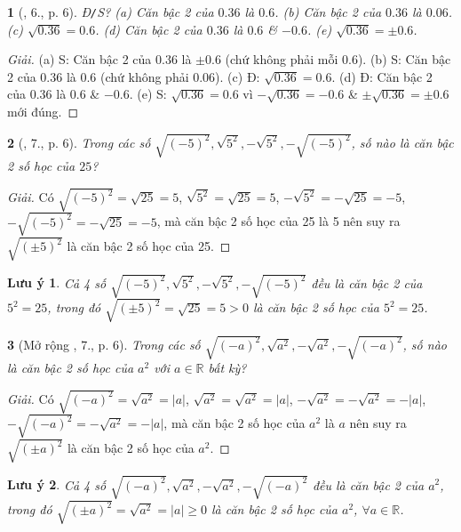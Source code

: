 \documentclass{article}
\newtheorem{baitoan}{}%
\newtheorem{luuy}{Lưu ý}
\begin{document}
\begin{baitoan}[\cite{SBT_Toan_9_tap_1}, 6., p. 6]
	\emph{Đ\texttt{/}S?} (a) Căn bậc 2 của $0.36$ là $0.6$. (b) Căn bậc 2 của $0.36$ là $0.06$. (c) $\sqrt{0.36} = 0.6$. (d) Căn bậc 2 của $0.36$ là $0.6$ \& $-0.6$. (e) $\sqrt{0.36} = \pm0.6$.
\end{baitoan}

\begin{proof}[Giải]
	(a) S: Căn bậc 2 của 0.36 là $\pm0.6$ (chứ không phải mỗi 0.6). (b) S: Căn bậc 2 của 0.36 là 0.6 (chứ không phải 0.06). (c) Đ: $\sqrt{0.36} = 0.6$. (d) Đ: Căn bậc 2 của $0.36$ là $0.6$ \& $-0.6$. (e) S: $\sqrt{0.36} = 0.6$ vì $-\sqrt{0.36} = -0.6$ \& $\pm\sqrt{0.36} = \pm0.6$ mới đúng.
\end{proof}

\begin{baitoan}[\cite{SBT_Toan_9_tap_1}, 7., p. 6]
	Trong các số $\sqrt{(-5)^2},\sqrt{5^2},-\sqrt{5^2},-\sqrt{(-5)^2}$, số nào là căn bậc 2 số học của $25$?
\end{baitoan}

\begin{proof}[Giải]
	Có $\sqrt{(-5)^2} = \sqrt{25} = 5$, $\sqrt{5^2} = \sqrt{25} = 5$, $-\sqrt{5^2} = -\sqrt{25} = -5$, $-\sqrt{(-5)^2} = -\sqrt{25} = -5$, mà căn bậc 2 số học của 25 là 5 nên suy ra $\sqrt{(\pm5)^2}$ là căn bậc 2 số học của 25.
\end{proof}

\begin{luuy}
	Cả 4 số $\sqrt{(-5)^2},\sqrt{5^2},-\sqrt{5^2},-\sqrt{(-5)^2}$ đều là căn bậc 2 của $5^2 = 25$, trong đó $\sqrt{(\pm5)^2} = \sqrt{25} = 5 > 0$ là căn bậc 2 số học của $5^2 = 25$.
\end{luuy}

\begin{baitoan}[Mở rộng \cite{SBT_Toan_9_tap_1}, 7., p. 6]
	Trong các số $\sqrt{(-a)^2},\sqrt{a^2},-\sqrt{a^2},-\sqrt{(-a)^2}$, số nào là căn bậc 2 số học của $a^2$ với $a\in\mathbb{R}$ bất kỳ?
\end{baitoan}

\begin{proof}[Giải]
	Có $\sqrt{(-a)^2} = \sqrt{a^2} = |a|$, $\sqrt{a^2} = \sqrt{a^2} = |a|$, $-\sqrt{a^2} = -\sqrt{a^2} = -|a|$, $-\sqrt{(-a)^2} = -\sqrt{a^2} = -|a|$, mà căn bậc 2 số học của $a^2$ là $a$ nên suy ra $\sqrt{(\pm a)^2}$ là căn bậc 2 số học của $a^2$.
\end{proof}

\begin{luuy}
	Cả 4 số $\sqrt{(-a)^2},\sqrt{a^2},-\sqrt{a^2},-\sqrt{(-a)^2}$ đều là căn bậc 2 của $a^2$, trong đó $\sqrt{(\pm a)^2} = \sqrt{a^2} = |a|\ge0$ là căn bậc 2 số học của $a^2$, $\forall a\in\mathbb{R}$.
\end{luuy}
\end{document}
